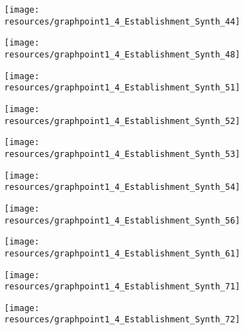 \documentclass[12pt]{article}
\begin{document}
\begin{figure}[H]
	\centering
	\begin{subfigure}[b]{0.4\textwidth}
	    \texttt{[image: resources/graphpoint1\_4\_Establishment\_Synth\_44]}
	\end{subfigure}
	\begin{subfigure}[b]{0.4\textwidth}
		  \texttt{[image: resources/graphpoint1\_4\_Establishment\_Synth\_48]}
	\end{subfigure}
\end{figure}

\begin{figure}[H]
	\centering
	\begin{subfigure}[b]{0.4\textwidth}
	    \texttt{[image: resources/graphpoint1\_4\_Establishment\_Synth\_51]}
	\end{subfigure}
	\begin{subfigure}[b]{0.4\textwidth}
		  \texttt{[image: resources/graphpoint1\_4\_Establishment\_Synth\_52]}
	\end{subfigure}
\end{figure}

\begin{figure}[H]
	\centering
	\begin{subfigure}[b]{0.4\textwidth}
	    \texttt{[image: resources/graphpoint1\_4\_Establishment\_Synth\_53]}
	\end{subfigure}
	\begin{subfigure}[b]{0.4\textwidth}
		  \texttt{[image: resources/graphpoint1\_4\_Establishment\_Synth\_54]}
	\end{subfigure}
\end{figure}

\begin{figure}[H]
	\centering
	\begin{subfigure}[b]{0.4\textwidth}
	    \texttt{[image: resources/graphpoint1\_4\_Establishment\_Synth\_56]}
	\end{subfigure}
	\begin{subfigure}[b]{0.4\textwidth}
		  \texttt{[image: resources/graphpoint1\_4\_Establishment\_Synth\_61]}
	\end{subfigure}
\end{figure}

\begin{figure}[H]
	\centering
	\begin{subfigure}[b]{0.4\textwidth}
	    \texttt{[image: resources/graphpoint1\_4\_Establishment\_Synth\_71]}
	\end{subfigure}
	\begin{subfigure}[b]{0.4\textwidth}
		  \texttt{[image: resources/graphpoint1\_4\_Establishment\_Synth\_72]}
	\end{subfigure}
\end{figure}
\end{document}
